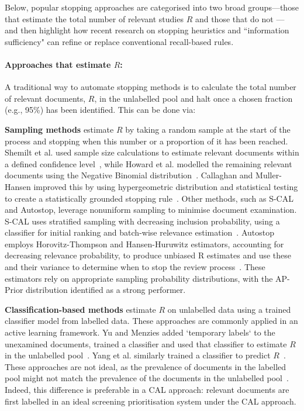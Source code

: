 \documentclass[10pt,oneside]{book}
\begin{document}
Below, popular stopping approaches are categorised into two broad groups—those that estimate the total number of relevant studies $R$ and those that do not — and then highlight how recent research on stopping heuristics and ``information sufficiency" can refine or replace conventional recall-based rules.

\paragraph{Approaches that estimate $R$:} A traditional way to automate stopping methods is to calculate the total number of relevant documents, $R$, in the unlabelled pool and halt once a chosen fraction (e.g., 95\%) has been identified. This can be done via:

\textbf{Sampling methods} estimate $R$ by taking a random sample at the start of the process and stopping when this number or a proportion of it has been reached. Shemilt et al. used sample size calculations to estimate relevant documents within a defined confidence level~\cite{shemilt_pinpointing_2014}, while Howard et al. modelled the remaining relevant documents using the Negative Binomial distribution~\cite{howard_swift-active_2020}. Callaghan and Muller-Hansen improved this by using hypergeometric distribution and statistical testing to create a statistically grounded stopping rule~\cite{callaghan_statistical_2020}. Other methods, such as S-CAL and Autostop, leverage nonuniform sampling to minimise document examination. S-CAL uses stratified sampling with decreasing inclusion probability, using a classifier for initial ranking and batch-wise relevance estimation~\cite{cormack_scalability_2016}. Autostop employs Horovitz-Thompson and Hansen-Huruwitz estimators, accounting for decreasing relevance probability, to produce unbiased R estimates and use these and their variance to determine when to stop the review process~\cite{li_when_2020}. These estimators rely on appropriate sampling probability distributions, with the AP-Prior distribution identified as a strong performer.

\textbf{Classification-based methods} estimate $R$ on unlabelled data using a trained classifier model from labelled data. These approaches are commonly applied in an active learning framework. Yu and Menzies added `temporary labels` to the unexamined documents, trained a classifier and used that classifier to estimate $R$ in the unlabelled pool~\cite{yu_fast2_2019}. Yang et al. similarly trained a classifier to predict $R$~\cite{yang_heuristic_2021}. These approaches are not ideal, as the prevalence of documents in the labelled pool might not match the prevalence of the documents in the unlabelled pool~\cite{del_coz_learning_2021}. Indeed, this difference is preferable in a CAL approach: relevant documents are first labelled in an ideal screening prioritisation system under the CAL approach. 
\end{document}
